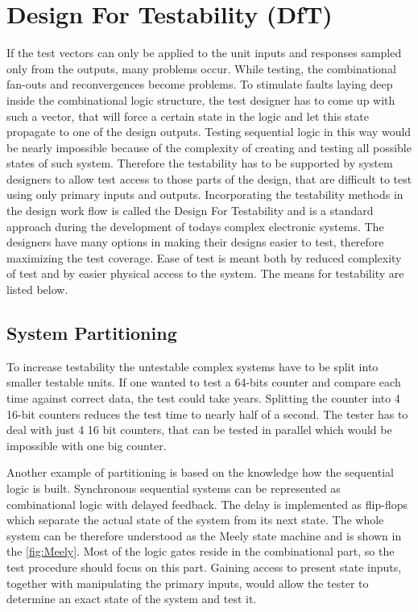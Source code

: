 \section{Design For Testability (DfT)}
If the test vectors can only be applied to the unit inputs and responses sampled only from the outputs, many problems occur. While testing, the combinational fan-outs and reconvergences become problems. To stimulate faults laying deep inside the combinational logic structure, the test designer has to come up with such a vector, that will force a certain state in the logic and let this state propagate to one of the design outputs. Testing sequential logic in this way would be nearly impossible because of the complexity of creating and testing all possible states of such system. Therefore the testability has to be supported by system designers to allow test access to those parts of the design, that are difficult to test using only primary inputs and outputs. Incorporating the testability methods in the design work flow is called the Design For Testability and is a standard approach during the development of todays complex electronic systems. The designers have many options in making their designs easier to test, therefore maximizing the test coverage. Ease of test is meant both by reduced complexity of test and by easier physical access to the system. The means for testability are listed below.
\subsection{System Partitioning}
To increase testability the untestable complex systems have to be split into smaller testable units. If one wanted to test a 64-bits counter and compare each time against correct data, the test could take years. Splitting the counter into 4 16-bit counters reduces the test time to nearly half of a second. The tester has to deal with just 4 16 bit counters, that can be tested in parallel which would be impossible with one big counter.

Another example of partitioning is based on the knowledge how the sequential logic is built. Synchronous sequential systems can be represented as combinational logic with delayed feedback. The delay is implemented as flip-flops which separate the actual state of the system from its next state. The whole system can be therefore understood as the Meely state machine and is shown in the \autoref{fig:Meely}. Most of the logic gates reside in the combinational part, so the test procedure should focus on this part. Gaining access to present state inputs, together with manipulating the primary inputs, would allow the tester to determine an exact state of the system and test it.

